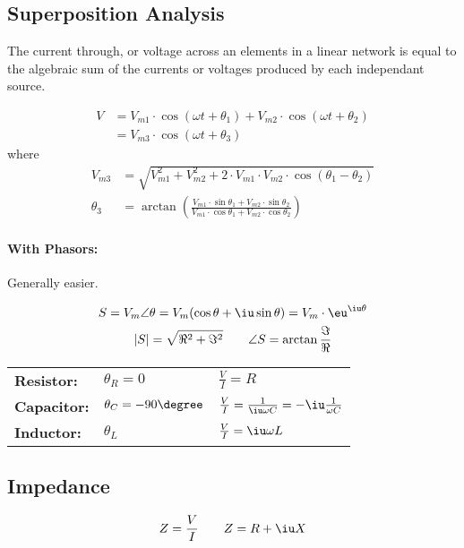 
\subsection{Superposition Analysis} %
	The current through, or voltage across an elements in a linear network is equal to the algebraic sum of the currents or voltages produced by each independant source.
	
	\begin{align*}
		V &= V_{m1} \cdot \cos(\omega t + \theta_1) + V_{m2} \cdot \cos(\omega t + \theta_2) \\
		&= V_{m3} \cdot \cos(\omega t + \theta_3)
	\end{align*}
	where
	\begin{align*}
		V_{m3} &= \sqrt{V_{m1}^2 + V_{m2}^2 + 2 \cdot V_{m1} \cdot V_{m2} \cdot \cos(\theta_1 - \theta_2)} \\
		\theta_3 &= \arctan \left(
			\frac{
				V_{m1} \cdot \sin \theta_1 + V_{m2} \cdot \sin \theta_2
			}{
				V_{m1} \cdot \cos \theta_1 + V_{m2} \cdot \cos \theta_2
			}
		\right)
	\end{align*}
		
		\paragraph{With Phasors:} %
			Generally easier.
			
			\begin{gather*}
				S = V_m \angle \theta = V_m (\cos \theta + \iu \sin \theta) = V_m \cdot \eu^{\iu\theta} \\
				|S| = \sqrt{\Re^2 + \Im^2} \qquad \angle S = \arctan \frac{\Im}{\Re}
			\end{gather*}
			
			\begin{tabular}{lll}
				\textbf{Resistor:} & $\theta_R = 0$ & $\frac{V}{I} = R$ \\ [2ex]
				\textbf{Capacitor:} & $\theta_C = -90\degree$ & $\frac{V}{I} = \frac{1}{\iu\omega C} = -\iu \frac{1}{\omega C}$ \\ [2ex]
				\textbf{Inductor:} & $\theta_L$ & $\frac{V}{I} = \iu\omega L$ \\
			\end{tabular}

\subsection{Impedance} %
	\[
		Z = \frac{V}{I} \qquad Z = R + \iu X
	\]
	

